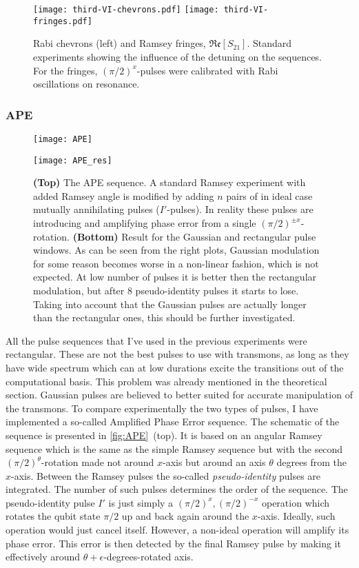 \documentclass[12pt, twoside]{report}
\numberwithin{equation}{section}
\begin{document}
\begin{figure}
\texttt{[image: third-VI-chevrons.pdf]}
\texttt{[image: third-VI-fringes.pdf]}
\caption{Rabi chevrons (left) and Ramsey fringes, $\mathfrak{Re}[S_{21}]$. Standard experiments showing the influence of the detuning on the sequences. For the fringes, $(\pi/2)^x$-pulses were calibrated with Rabi oscillations on resonance.}
\label{fig:third-VI-chevrons-fringes}
\end{figure}

\subsubsection{APE}

\begin{figure}
\centering
\texttt{[image: APE]}

\vspace{0.5cm}
\texttt{[image: APE\_res]}
\caption{\textbf{(Top)} The APE sequence. A standard Ramsey experiment with added Ramsey angle is modified by adding $n$ pairs of in ideal case mutually annihilating pulses ($I'$-pulses). In reality these pulses are introducing and amplifying phase error from a single $(\pi/2)^{\pm x}$-rotation. \textbf{(Bottom)} Result for the Gaussian and rectangular pulse windows. As can be seen from the right plots, Gaussian modulation for some reason becomes worse in a non-linear fashion, which is not expected. At low number of pulses it is better then the rectangular modulation, but after 8 pseudo-identity pulses it starts to lose. Taking into account that the Gaussian pulses are actually longer than the rectangular ones, this should be further investigated.}
\label{fig:APE}
\end{figure}

All the pulse sequences that I've used in the previous experiments were rectangular. These are not the best pulses to use with transmons, as long as they have wide spectrum which can at low durations excite the transitions out of the computational basis. This problem was already mentioned in the theoretical section. Gaussian pulses are believed to better suited for accurate manipulation of the transmons. To compare experimentally the two types of pulses, I have implemented a so-called Amplified Phase Error sequence\cite{Lucero2010}. The schematic of the sequence is presented in \autoref{fig:APE}~(top). It is based on an angular Ramsey sequence which is the same as the simple Ramsey sequence but with the second $(\pi/2)^\theta$-rotation made not around $x$-axis but around an axis $\theta$ degrees from the $x$-axis. Between the Ramsey pulses the so-called \textit{pseudo-identity} pulses are integrated. The number of such pulses determines the order of the sequence. The pseudo-identity pulse $I'$ is just simply a $(\pi/2)^x, (\pi/2)^{-x}$ operation which rotates the qubit state  $\pi/2$ up and back again around the $x$-axis. Ideally, such operation would just cancel itself. However, a non-ideal operation will amplify its phase error.\cite{Lucero2010} This error is then detected by the final Ramsey pulse by making it effectively around $\theta + \epsilon$-degrees-rotated axis.
\end{document}
